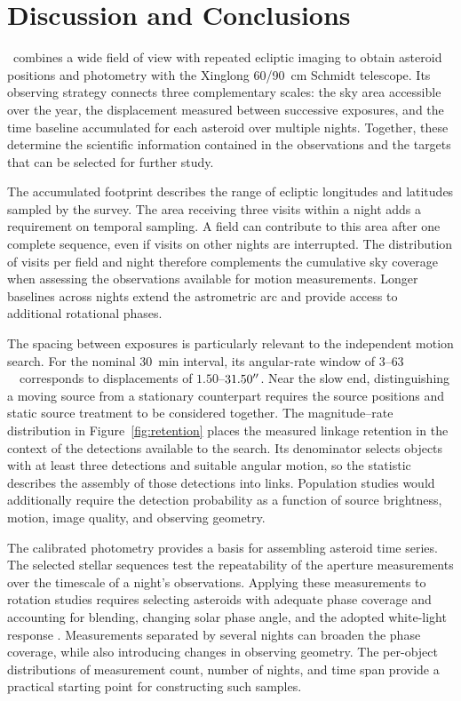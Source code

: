 \section{Discussion and Conclusions}
\label{sec:discussion}
\label{sec:conclusions}

\SHARP\ combines a wide field of view with repeated ecliptic imaging
to obtain asteroid positions and photometry with the Xinglong 60/90~cm
Schmidt telescope. Its observing strategy connects three complementary
scales: the sky area accessible over the year, the displacement measured
between successive exposures, and the time baseline accumulated for each
asteroid over multiple nights. Together, these determine the scientific
information contained in the observations and the targets that can be
selected for further study.

The accumulated footprint describes the range of ecliptic longitudes
and latitudes sampled by the survey. The area receiving three visits
within a night adds a requirement on temporal sampling. A field can
contribute to this area after one complete sequence, even if visits on
other nights are interrupted. The distribution of visits per field and
night therefore complements the cumulative sky coverage when assessing
the observations available for motion measurements. Longer baselines
across nights extend the astrometric arc and provide access to additional
rotational phases.

The spacing between exposures is particularly relevant to the independent
motion search. For the nominal 30~min interval, its angular-rate window
of $3$--$63$~\rateunit\ corresponds to displacements of
$1.50$--$31.50^{\prime\prime}$. Near the slow end, distinguishing a moving source
from a stationary counterpart requires the source positions and static
source treatment to be considered together. The magnitude--rate
distribution in Figure~\ref{fig:retention} places the measured linkage
retention in the context of the detections available to the search.
Its denominator selects objects with at least three detections and
suitable angular motion, so the statistic describes the assembly of
those detections into links. Population studies would additionally
require the detection probability as a function of source brightness,
motion, image quality, and observing geometry.

The calibrated photometry provides a basis for assembling asteroid time
series. The selected stellar sequences test the repeatability of the
aperture measurements over the timescale of a night's observations.
Applying these measurements to rotation studies requires selecting
asteroids with adequate phase coverage and accounting for blending,
changing solar phase angle, and the adopted white-light response
\citep{WarnerHarrisPravec2009}. Measurements separated by several nights
can broaden the phase coverage, while also introducing changes in
observing geometry. The per-object distributions of measurement count,
number of nights, and time span provide a practical starting point for
constructing such samples.

